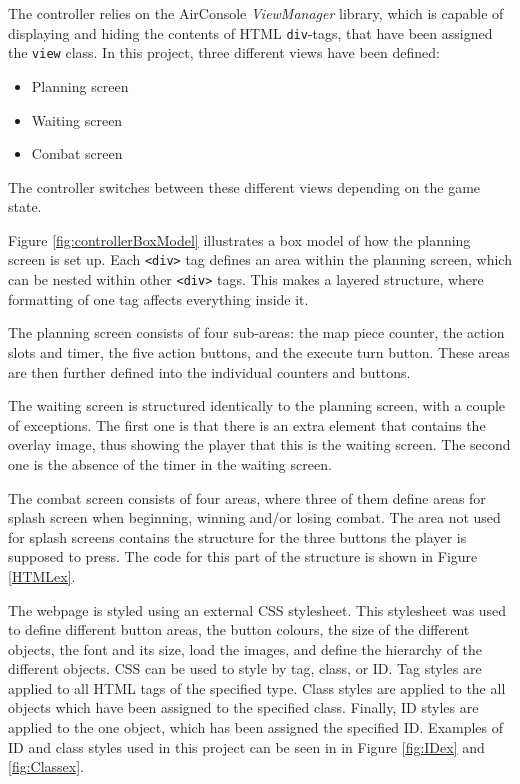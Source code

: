 The controller relies on the AirConsole \textit{ViewManager} library, which is capable of displaying and hiding the contents of HTML \texttt{div}-tags, that have been assigned the \texttt{view} class. In this project, three different views have been defined:
\begin{itemize}
	\item Planning screen
	\item Waiting screen
	\item Combat screen
\end{itemize}

The controller switches between these different views depending on the game state.

Figure \ref{fig:controllerBoxModel} illustrates a box model of how the planning screen is set up. Each \texttt{<div>} tag defines an area within the planning screen, which can be nested within other \texttt{<div>} tags. This makes a layered structure, where formatting of one tag affects everything inside it.

The planning screen consists of four sub-areas: the map piece counter, the action slots and timer, the five action buttons, and the execute turn button. These areas are then further defined into the individual counters and buttons.

The waiting screen is structured identically to the planning screen, with a couple of exceptions. The first one is that there is an extra element that contains the overlay image, thus showing the player that this is the waiting screen. The second one is the absence of the timer in the waiting screen.

The combat screen consists of four areas, where three of them define areas for splash screen when beginning, winning and/or losing combat. The area not used for splash screens contains the structure for the three buttons the player is supposed to press. The code for this part of the structure is shown in Figure \ref{HTMLex}.

The webpage is styled using an external CSS stylesheet. This stylesheet was used to define different button areas, the button colours, the size of the different objects, the font and its size, load the images, and define the hierarchy of the different objects. CSS can be used to style by tag, class, or ID. Tag styles are applied to all HTML tags of the specified type. Class styles are applied to the all objects which have been assigned to the specified class. Finally, ID styles are applied to the one object, which has been assigned the specified ID. Examples of ID and class styles used in this project can be seen in in Figure \ref{fig:IDex} and \ref{fig:Classex}. 

